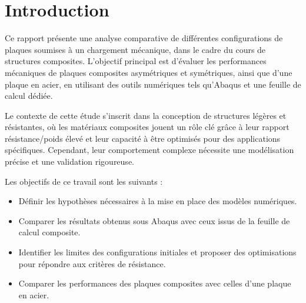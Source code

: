 \documentclass[a4paper,12pt]{article}
\begin{document}
\pagestyle{fancy}
\fancyhf{} %
\fancyfoot[R]{\thepage} %
\renewcommand{\headrulewidth}{0.4pt} %

\tableofcontents
\newpage

\section{Introduction}

Ce rapport présente une analyse comparative de différentes configurations de plaques soumises à un chargement mécanique, dans le cadre du cours de structures composites. L'objectif principal est d'évaluer les performances mécaniques de plaques composites asymétriques et symétriques, ainsi que d'une plaque en acier, en utilisant des outils numériques tels qu'Abaqus et une feuille de calcul dédiée.

Le contexte de cette étude s'inscrit dans la conception de structures légères et résistantes, où les matériaux composites jouent un rôle clé grâce à leur rapport résistance/poids élevé et leur capacité à être optimisés pour des applications spécifiques. Cependant, leur comportement complexe nécessite une modélisation précise et une validation rigoureuse.

Les objectifs de ce travail sont les suivants :
\begin{itemize}
	\item Définir les hypothèses nécessaires à la mise en place des modèles numériques.
	\item Comparer les résultats obtenus sous Abaqus avec ceux issus de la feuille de calcul composite.
	\item Identifier les limites des configurations initiales et proposer des optimisations pour répondre aux critères de résistance.
	\item Comparer les performances des plaques composites avec celles d'une plaque en acier.
\end{itemize}
\end{document}
